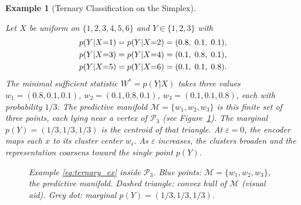 \documentclass[11pt]{article}
\newtheorem{example}{Example}
\begin{document}
\begin{example}[Ternary Classification on the Simplex]
\label{ex:ternary_example}

Let $X$ be uniform on $\{1,2,3,4,5,6\}$ and $Y\in\{1,2,3\}$ with
\begin{align}
    p(Y|X{=}1) = p(Y|X{=}2) &= (0.8,\;0.1,\;0.1), \notag\\
    p(Y|X{=}3) = p(Y|X{=}4) &= (0.1,\;0.8,\;0.1), \notag\\
    p(Y|X{=}5) = p(Y|X{=}6) &= (0.1,\;0.1,\;0.8).
    \label{eq:ternary_ex}
\end{align}
The minimal sufficient statistic $W^*=p(Y|X)$ takes three values
$w_1=(0.8,0.1,0.1)$, $w_2=(0.1,0.8,0.1)$, $w_3=(0.1,0.1,0.8)$,
each with probability $1/3$.
The predictive manifold $\mathcal{M}=\{w_1,w_2,w_3\}$ is this finite
set of three points, each lying near a vertex of $\mathcal{P}_3$
(see Figure~\ref{fig:ternary}).
The marginal $p(Y)=(1/3,1/3,1/3)$ is the centroid of that triangle.
At $\varepsilon=0$, the encoder maps each $x$ to its cluster
center $w_i$.
As $\varepsilon$ increases, the clusters broaden and the representation
coarsens toward the single point $p(Y)$.

\begin{figure}[h]
\centering
{}
\caption{Example \eqref{eq:ternary_ex} inside $\mathcal{P}_3$.
Blue points: $\mathcal{M}=\{w_1,w_2,w_3\}$, the predictive manifold.
Dashed triangle: convex hull of $\mathcal{M}$ (visual aid).
Grey dot: marginal $p(Y)=(1/3,1/3,1/3)$.}
\label{fig:ternary}
\end{figure}

\end{example}
\end{document}
